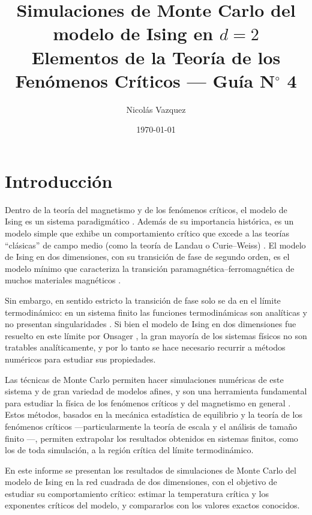 \documentclass[a4paper,11pt]{article}
\title{Simulaciones de Monte Carlo del modelo de Ising en $d = 2$\\[0.3em]
\large Elementos de la Teoría de los Fenómenos Críticos --- Guía N$^\circ$ 4}
\author{Nicolás Vazquez}
\date{\today}
\begin{document}
\maketitle


\section{Introducción}
Dentro de la teoría del magnetismo y de los fenómenos críticos, el modelo de Ising es un sistema paradigmático \cite{tauberCriticalDynamicsField2014}.
Además de su importancia histórica, es un modelo simple que exhibe un comportamiento crítico que excede a las teorías ``clásicas'' de campo medio (como la teoría de Landau o Curie--Weiss) \cite{salinasIntroductionStatisticalPhysics2001}.
El modelo de Ising en dos dimensiones, con su transición de fase de segundo orden, es el modelo mínimo que caracteriza la transición paramagnética--ferromagnética de muchos materiales magnéticos \cite{blundellMagnetismCondensedMatter2023}. 

Sin embargo, en sentido estricto la transición de fase solo se da en el límite termodinámico: en un sistema finito las funciones termodinámicas son analíticas y no presentan singularidades \cite{goldenfeldLecturesPhaseTransitions2018}.
Si bien el modelo de Ising en dos dimensiones fue resuelto en este límite por Onsager \cite{Onsager1944}, la gran mayoría de los sistemas físicos no son tratables analíticamente, y por lo tanto se hace necesario recurrir a métodos numéricos para estudiar sus propiedades.

Las técnicas de Monte Carlo permiten hacer simulaciones numéricas de este sistema y de gran variedad de modelos afines, y son una herramienta fundamental para estudiar la física de los fenómenos críticos y del magnetismo en general \cite{landauGuideMonteCarlo2020}. 
Estos métodos, basados en la mecánica estadística de equilibrio y la teoría de los fenómenos críticos ---particularmente la teoría de escala y el análisis de tamaño finito \cite{cardy1988finite}---, permiten extrapolar los resultados obtenidos en sistemas finitos, como los de toda simulación, a la región crítica del límite termodinámico.

En este informe se presentan los resultados de simulaciones de Monte Carlo del modelo de Ising en la red cuadrada de dos dimensiones, con el objetivo de estudiar su comportamiento crítico: estimar la temperatura crítica y los exponentes críticos del modelo, y compararlos con los valores exactos conocidos.
\end{document}
